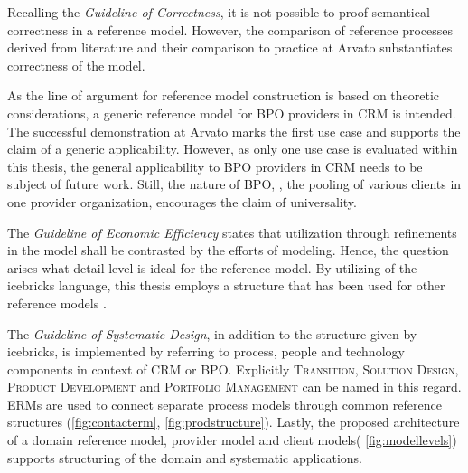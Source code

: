 	Recalling the \textit{Guideline of Correctness}, it is not possible to proof semantical correctness in a reference model. However, the comparison of reference processes derived from literature and their comparison to practice at Arvato substantiates correctness of the model. 
	
As the line of argument for reference model construction is based on theoretic considerations, a generic reference model for BPO providers in CRM is intended. The successful demonstration at Arvato marks the first use case and supports the claim of a generic applicability. However, as only one use case is evaluated within this thesis, the general applicability to BPO providers in CRM needs to be subject of future work. Still, the nature of BPO, \ie, the pooling of various clients in one provider organization, encourages the claim of universality. 

The \textit{Guideline of Economic Efficiency} states that utilization through refinements in the model shall be contrasted by the efforts of modeling. Hence, the question arises what detail level is ideal for the reference model. By utilizing of the icebricks language, this thesis employs a structure that has been used for other reference models \citep{Puster2015, 9783832540920}. 

The \textit{Guideline of Systematic Design}, in addition to the structure given by icebricks, is implemented by referring to process, people and technology components in context of CRM or BPO. Explicitly \textsc{Transition}, \textsc{Solution Design}, \textsc{Product Development}  and \textsc{Portfolio Management} can be named in this regard. \acrshort{ERM}s are used to connect separate process models through common reference structures (\cf \Fig \ref{fig:contacterm}, \Fig \ref{fig:prodstructure}). Lastly, the proposed architecture of a domain reference model, provider model and client models( \cf \Fig \ref{fig:modellevels}) supports structuring of the domain and systematic applications. 


